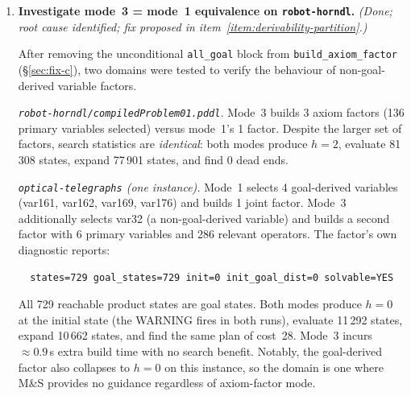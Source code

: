 \documentclass[11pt,a4paper]{article}
\begin{document}
\begin{enumerate}
    \textbf{v3 results} (2026-09-07): the memory cap eliminates the OOM crashes.
    Coverage: blind 487, mode~0 489, mode~1 501, mode~2 504, mode~3 \textbf{507}.
    Mode~3 outperforms mode~0 by 18 instances (vs.\ $-4$ in v2).
    On \texttt{robot-horndl}: mode~3 now solves 38 (mode~0: 29, blind: 43).
    On \texttt{robotConj-horndl}: mode~3 solves 21 (mode~0: 23, blind: 43) ---
    \texttt{exitcode-248} is absent from v3 entirely: the memory cap
    fully eliminates construction-phase OOM.  The remaining unsolved instances
    are \texttt{search-out-of-time} --- axiom-factor construction consumes
    part of the 5-minute budget, leaving less time for search, while blind
    (h=0) avoids construction and dominates both domains (43 solved vs.\
    mode~3's 38/21).
    All five configurations remain admissible (identical plan costs on jointly
    solved instances, total 6143).

  \item \textbf{Investigate mode~3 = mode~1 equivalence on
    \texttt{robot-horndl}.}  \emph{(Done; root cause identified; fix proposed in item~\ref{item:derivability-partition}.)}



    After removing the unconditional \texttt{all\_goal} block from
    \texttt{build\_axiom\_factor} (\S\ref{sec:fix-c}), two domains were tested
    to verify the behaviour of non-goal-derived variable factors.

    \textit{\texttt{robot-horndl/compiledProblem01.pddl}.}
    Mode~3 builds 3 axiom factors (136 primary variables selected) versus
    mode~1's 1 factor.  Despite the larger set of factors, search statistics
    are \emph{identical}: both modes produce $h = 2$, evaluate 81\,308 states,
    expand 77\,901 states, and find 0 dead ends.

    \textit{\texttt{optical-telegraphs} (one instance).}
    Mode~1 selects 4 goal-derived variables (var161, var162, var169, var176)
    and builds 1 joint factor.  Mode~3 additionally selects var32 (a
    non-goal-derived variable) and builds a second factor with 6 primary
    variables and 286 relevant operators.  The factor's own diagnostic reports:
    \begin{verbatim}
  states=729 goal_states=729 init=0 init_goal_dist=0 solvable=YES
    \end{verbatim}
    All 729 reachable product states are goal states.  Both modes produce
    $h = 0$ at the initial state (the WARNING fires in both runs), evaluate
    11\,292 states, expand 10\,662 states, and find the same plan of cost~28.
    Mode~3 incurs $\approx 0.9$\,s extra build time with no search benefit.
    Notably, the goal-derived factor also collapses to $h = 0$ on this
    instance, so the domain is one where M\&S provides no guidance regardless
    of axiom-factor mode.


\end{enumerate}
\end{document}

